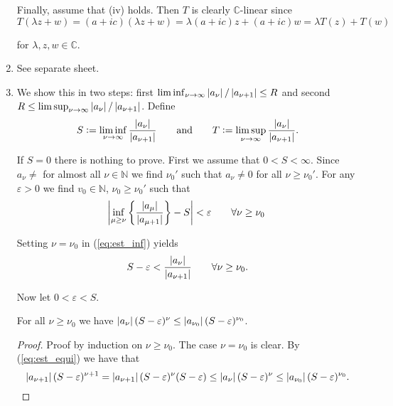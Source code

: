 \begin{enumerate}[label = \textbf{Exercise \arabic*.},wide = 0pt, itemsep=1.5ex]
		Finally, assume that (iv) holds. Then $T$ is clearly $\mathbb{C}$-linear since 
		\begin{equation}
			T(\lambda z + w) = (a + ic)(\lambda z + w) = \lambda(a + ic)z + (a + ic)w = \lambda T(z) + T(w)
		\end{equation}

		\noindent for $\lambda,z,w \in \mathbb{C}$.

	\item See separate sheet.

	\item We show this in two steps: first $\liminf_{\nu \to \infty}\abs[0]{a_\nu}/\abs[0]{a_{\nu + 1}} \leq R$ and second $R \leq \limsup_{\nu \to \infty}\abs[0]{a_\nu}/\abs[0]{a_{\nu + 1}}$. Define 
		\begin{equation}
			S := \liminf_{\nu \to \infty}\frac{\abs[0]{a_\nu}}{\abs[0]{a_{\nu + 1}}} \qquad \text{and} \qquad T := \limsup_{\nu \to \infty}\frac{\abs[0]{a_\nu}}{\abs[0]{a_{\nu + 1}}}.
		\end{equation}

		If $S = 0$ there is nothing to prove. First we assume that $0 < S < \infty$. Since $a_\nu \neq $ for almost all $\nu \in \mathbb{N}$ we find $\nu_0'$ such that $a_\nu \neq 0$ for all $\nu \geq \nu_0'$. For any $\varepsilon > 0$ we find $v_0 \in \mathbb{N}$, $\nu_0 \geq \nu_0'$ such that
		\begin{equation}
			\abs[3]{\inf_{\mu \geq \nu}\cbr[3]{\frac{\abs[0]{a_\mu}}{\abs[0]{a_{\mu + 1}}}} - S} < \varepsilon \qquad \forall \nu \geq \nu_0
			\label{eq:est_inf}
		\end{equation}

		Setting $\nu = \nu_0$ in (\ref{eq:est_inf}) yields 
		\begin{equation}
			S - \varepsilon < \frac{\abs[0]{a_\nu}}{\abs[0]{a_{\nu + 1}}}  \qquad \forall \nu \geq \nu_0.
			\label{eq:est_equi}
		\end{equation}

		Now let $0 < \varepsilon < S$.

		\begin{lemma}
			For all $\nu \geq \nu_0$ we have $\abs[0]{a_\nu}(S - \varepsilon)^\nu \leq \abs[0]{a_{\nu_0}}(S - \varepsilon)^{\nu_0}$.
			\label{lem:ind}
		\end{lemma}

		\begin{proof}
			Proof by induction on $\nu \geq \nu_0$. The case $\nu = \nu_0$ is clear. By (\ref{eq:est_equi}) we have that
			\begin{equation}
				\abs[0]{a_{\nu + 1}}(S - \varepsilon)^{\nu + 1} = 	\abs[0]{a_{\nu + 1}}(S - \varepsilon)^{\nu}(S - \varepsilon) \leq \abs[0]{a_\nu}(S - \varepsilon)^\nu \leq \abs[0]{a_{\nu_0}}(S - \varepsilon)^{\nu_0}.  
			\end{equation}
		\end{proof}


\end{enumerate}
